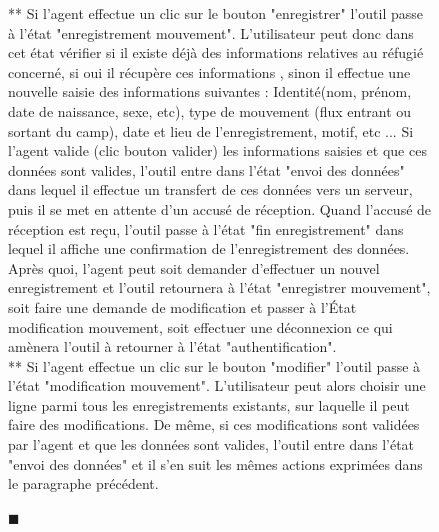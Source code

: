 \documentclass[11pt, titlepage]{report}
\newcommand{\finDescription}{\noindent\textcolor{DescriptionColor}{$\blacksquare$}}
\begin{document}
\begin{figure}[h!]
\begin{small}
** Si l'agent effectue un clic sur le bouton "enregistrer" l'outil passe à l'état "enregistrement mouvement". L'utilisateur peut donc dans cet état vérifier si il existe déjà des informations relatives au réfugié concerné, si oui il récupère ces informations , sinon il effectue une nouvelle saisie des informations suivantes : Identité(nom, prénom, date de naissance, sexe, etc), type de mouvement (flux entrant ou sortant du camp), date et lieu de l'enregistrement, motif, etc ... Si l'agent valide (clic bouton valider) les informations saisies et que ces données sont valides, l'outil entre dans l’état "envoi des données" dans lequel il effectue un transfert de ces données vers un serveur, puis il se met en attente d'un accusé de réception. Quand l'accusé de réception est reçu, l'outil passe à l'état "fin enregistrement" dans lequel il affiche une confirmation de l'enregistrement des données. Après quoi, l'agent peut soit demander d'effectuer un nouvel enregistrement et l'outil retournera à l'état "enregistrer mouvement", soit faire une demande de modification et passer à l’État modification mouvement, soit effectuer une déconnexion ce qui amènera l’outil à retourner à l'état "authentification".\\

** Si l'agent effectue un clic sur le bouton "modifier" l'outil passe à l'état "modification mouvement". L'utilisateur peut alors choisir une ligne parmi tous les enregistrements existants, sur laquelle il peut faire des modifications. De même, si ces modifications sont validées par l'agent et que les données sont valides, l'outil entre dans l'état "envoi des données" et il s'en suit les mêmes actions exprimées dans le paragraphe précédent.
\end{small}
\finDescription
\end{figure}
\end{document}
